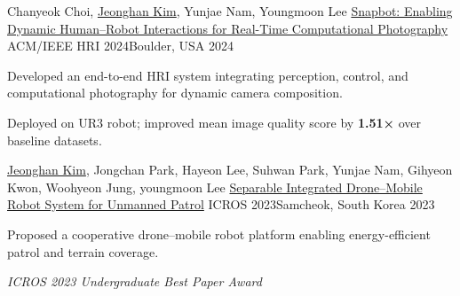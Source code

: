 

\begin{cventries}

  \cvpublication
  {Chanyeok Choi, \underline{Jeonghan Kim}, Yunjae Nam, Youngmoon Lee} %
  {\href{https://dl.acm.org/doi/10.1145/3610978.3640712}{Snapbot: Enabling Dynamic Human–Robot Interactions for Real-Time Computational Photography}} %
  {ACM/IEEE HRI 2024\newline Boulder, USA} %
  {2024} %
  {
    \begin{cvitems}
      \item {Developed an end-to-end HRI system integrating perception, control, and computational photography for dynamic camera composition.}
      \item {Deployed on UR3 robot; improved mean image quality score by \textbf{1.51×} over baseline datasets.}
    \end{cvitems}
  }

  \cvpublication
  {\underline{Jeonghan Kim}, Jongchan Park, Hayeon Lee, Suhwan Park, Yunjae Nam, Gihyeon Kwon, Woohyeon Jung, youngmoon Lee} %
  {\href{https://www.dbpia.co.kr/journal/articleDetail?nodeId=NODE11480514}{Separable Integrated Drone–Mobile Robot System for Unmanned Patrol}} %
  {ICROS 2023\newline Samcheok, South Korea} %
  {2023} %
  {
    \begin{cvitems}
      \item {Proposed a cooperative drone–mobile robot platform enabling energy-efficient patrol and terrain coverage.}
      \item {\textit{ICROS 2023 Undergraduate Best Paper Award}}
    \end{cvitems}
  }
\end{cventries}
